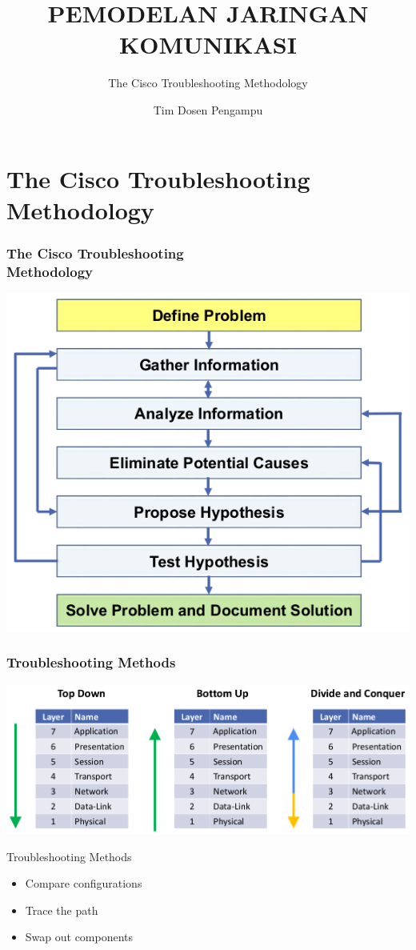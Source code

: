 \documentclass[pdflatex,compress,mathserif]{beamer}
\title{PEMODELAN JARINGAN KOMUNIKASI}
\subtitle{The Cisco Troubleshooting Methodology}
\author{Tim Dosen Pengampu}
\begin{document}
\maketitle

\section{The Cisco Troubleshooting Methodology}

\begin{frame}
	\frametitle{The Cisco Troubleshooting\\Methodology}
	\begin{center}
		\includegraphics[width=0.7\linewidth]{img/img01}
	\end{center}
\end{frame}

\begin{frame}
	\frametitle{Troubleshooting Methods}
	\begin{center}
		\includegraphics[width=\linewidth]{img/img02}
	\end{center}
\end{frame}

\begin{frame}{Troubleshooting Methods}
	\begin{itemize}
		\item Compare configurations
		\item Trace the path
		\item Swap out components
	\end{itemize}
\end{frame}
\end{document}

